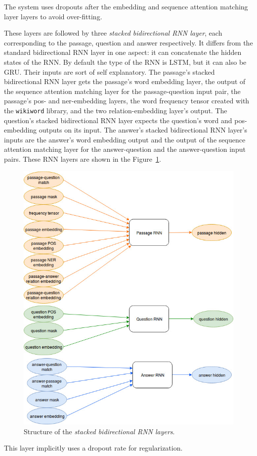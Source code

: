 The system uses dropouts after the embedding and sequence attention matching layer layers to avoid over-fitting.

These layers are followed by three \textit{stacked bidirectional RNN layer}, each corresponding to the passage, question and answer respectively. It differs from the standard bidirectional RNN layer in one aspect: it can concatenate the hidden states of the RNN. By default the type of the RNN is LSTM, but it can also be GRU. Their inputs are sort of self explanatory. The passage's stacked bidirectional RNN layer gets the passage's word embedding layer, the output of the sequence attention matching layer for the passage-question input pair, the passage's pos- and ner-embedding layers, the word frequency tensor created with the \texttt{wikiword} library, and the two relation-embedding layer's output. The question's stacked bidirectional RNN layer expects the question's word and pos-embedding outputs on its input. The answer's stacked bidirectional RNN layer's inputs are the answer's word embedding output and  the output of the sequence attention matching layer for the answer-question and the answer-question input pairs. These RNN layers are shown in the Figure~\ref{fig:rnn}.
\begin{figure}[h!]
	\centering
	\includegraphics[scale=0.4]{TriAN_rnn.jpg}
	\caption{Structure of the \textit{stacked bidirectional RNN layers}.}
	\label{fig:rnn}
\end{figure}
This layer implicitly uses a dropout rate for regularization.

